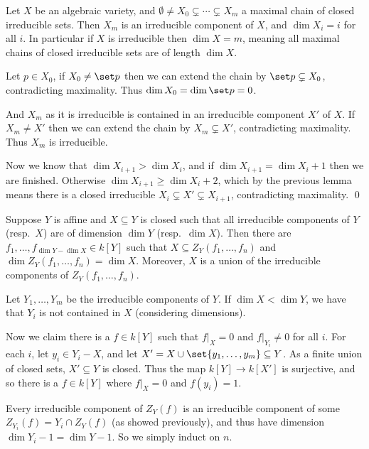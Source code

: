 \eproof

\bcoro

    Let $X$ be an algebraic variety, and $\emptyset\neq X_0\subsetneq\cdots\subsetneq X_m$ a maximal chain of closed irreducible sets.
    Then $X_m$ is an irreducible component of $X$, and $\dim X_i=i$ for all $i$.
    In particular if $X$ is irreducible then $\dim X=m$, meaning all maximal chains of closed irreducible sets are of length $\dim X$.

\ecoro

\bproof

    Let $p\in X_0$, if $X_0\neq\set p$ then we can extend the chain by $\set p\subsetneq X_0$, contradicting maximality.
    Thus $\dim X_0=\dim\set p=0$.

    And $X_m$ as it is irreducible is contained in an irreducible component $X'$ of $X$.
    If $X_m\neq X'$ then we can extend the chain by $X_m\subsetneq X'$, contradicting maximality.
    Thus $X_m$ is irreducible.

    Now we know that $\dim X_{i+1}>\dim X_i$, and if $\dim X_{i+1}=\dim X_i+1$ then we are finished.
    Otherwise $\dim X_{i+1}\geq\dim X_i+2$, which by the previous lemma means there is a closed irreducible $X_i\subsetneq X'\subsetneq X_{i+1}$,
    contradicting maximality.
    \qed

\eproof

\blemm

    Suppose $Y$ is affine and $X\subseteq Y$ is closed such that all irreducible components of $Y$ (resp.\ $X$) are of dimension
    $\dim Y$ (resp.\ $\dim X$).
    Then there are $f_1,\dots,f_{\dim Y-\dim X}\in k[Y]$ such that $X\subseteq Z_Y(f_1,\dots,f_n)$ and $\dim Z_Y(f_1,\dots,f_n)=\dim X$.
    Moreover, $X$ is a union of the irreducible components of $Z_Y(f_1,\dots,f_n)$.

\elemm

\bproof

    Let $Y_1,\dots,Y_m$ be the irreducible components of $Y$.
    If $\dim X<\dim Y$, we have that $Y_i$ is not contained in $X$ (considering dimensions).

    Now we claim there is a $f\in k[Y]$ such that $f|_X=0$ and $f|_{Y_i}\neq0$ for all $i$.
    For each $i$, let $y_i\in Y_i-X$, and let $X'=X\cup\set{y_1,\dots,y_m}\subseteq Y$.
    As a finite union of closed sets, $X'\subseteq Y$ is closed.
    Thus the map $k[Y]\to k[X']$ is surjective, and so there is a $f\in k[Y]$ where $f|_X=0$ and $f(y_i)=1$.

    Every irreducible component of $Z_Y(f)$ is an irreducible component of some $Z_{Y_i}(f)=Y_i\cap Z_Y(f)$ (as showed previously), 
    and thus have dimension $\dim Y_i-1=\dim Y-1$.
    So we simply induct on $n$.

